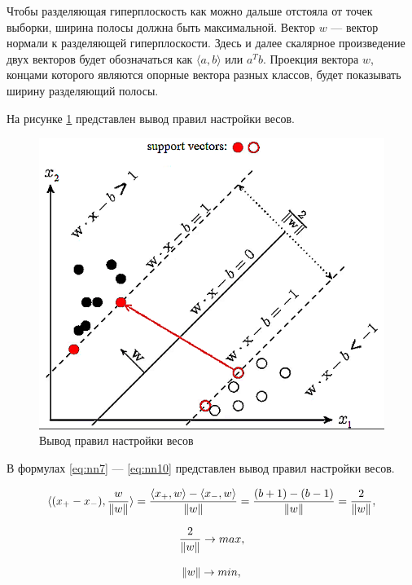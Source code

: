 Чтобы разделяющая гиперплоскость как можно дальше отстояла от точек выборки, ширина полосы должна быть максимальной. Вектор $w$ --- вектор нормали к разделяющей гиперплоскости. Здесь и далее скалярное произведение двух векторов будет обозначаться как $\langle a,b\rangle$ или $a^Tb$. Проекция вектора $w$, концами которого являются опорные вектора разных классов, будет показывать ширину разделяющий полосы.

На рисунке \ref{fig:svm2} представлен вывод правил настройки весов.

\begin{figure}[H]
	\centering
	\includegraphics[width=\textwidth]{img/svm2.png}
	\caption{Вывод правил настройки весов}
	\label{fig:svm2}
\end{figure}

В формулах \ref{eq:nn7} --- \ref{eq:nn10} представлен вывод правил настройки весов.

\begin{equation}
	\label{eq:nn7}
	\langle(x_+-x_-),\frac{w}{\Arrowvert w\Arrowvert}\rangle = \frac{\langle x_+,w\rangle - \langle x_-,w\rangle}{\Arrowvert w\Arrowvert} = \frac{(b+1)-(b-1)}{\Arrowvert w\Arrowvert} = \frac{2}{\Arrowvert w\Arrowvert},
\end{equation}

\begin{equation}
	\label{eq:nn8}
	\frac{2}{\Arrowvert w\Arrowvert} \rightarrow max,
\end{equation}

\begin{equation}
	\label{eq:nn9}
	\Arrowvert w\Arrowvert \rightarrow min,
\end{equation}

